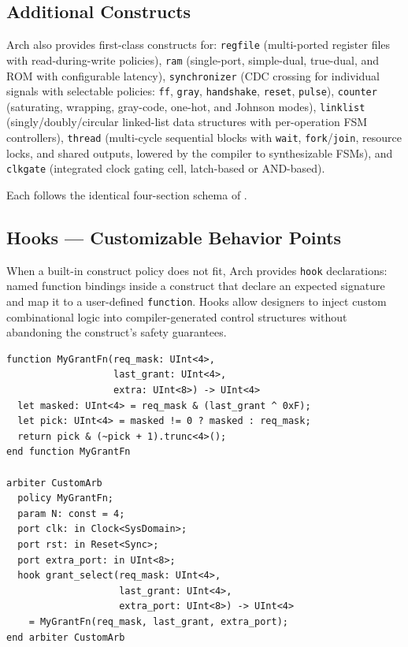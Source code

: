 \documentclass[11pt,twocolumn]{article}
\begin{document}
\subsection{Additional Constructs}

Arch also provides first-class constructs for:
\texttt{regfile} (multi-ported register files with read-during-write policies),
\texttt{ram} (single-port, simple-dual, true-dual, and ROM with configurable latency),
\texttt{synchronizer} (CDC crossing for individual signals with selectable policies: \texttt{ff}, \texttt{gray}, \texttt{handshake}, \texttt{reset}, \texttt{pulse}),
\texttt{counter} (saturating, wrapping, gray-code, one-hot, and Johnson modes),
\texttt{linklist} (singly/doubly/circular linked-list data structures with per-operation FSM controllers),
\texttt{thread} (multi-cycle sequential blocks with \texttt{wait}, \texttt{fork}/\texttt{join}, resource locks, and shared outputs, lowered by the compiler to synthesizable FSMs), and
\texttt{clkgate} (integrated clock gating cell, latch-based or AND-based).

Each follows the identical four-section schema of .

\subsection{Hooks --- Customizable Behavior Points}\label{sec:hooks}

When a built-in construct policy does not fit, Arch provides \texttt{hook} declarations: named function bindings inside a construct that declare an expected signature and map it to a user-defined \texttt{function}. Hooks allow designers to inject custom combinational logic into compiler-generated control structures without abandoning the construct's safety guarantees.

\begin{lstlisting}[language=Arch,caption={Custom arbiter policy via hook},label={lst:hook}]
function MyGrantFn(req_mask: UInt<4>,
                   last_grant: UInt<4>,
                   extra: UInt<8>) -> UInt<4>
  let masked: UInt<4> = req_mask & (last_grant ^ 0xF);
  let pick: UInt<4> = masked != 0 ? masked : req_mask;
  return pick & (~pick + 1).trunc<4>();
end function MyGrantFn

arbiter CustomArb
  policy MyGrantFn;
  param N: const = 4;
  port clk: in Clock<SysDomain>;
  port rst: in Reset<Sync>;
  port extra_port: in UInt<8>;
  hook grant_select(req_mask: UInt<4>,
                    last_grant: UInt<4>,
                    extra_port: UInt<8>) -> UInt<4>
    = MyGrantFn(req_mask, last_grant, extra_port);
end arbiter CustomArb
\end{lstlisting}
\end{document}
